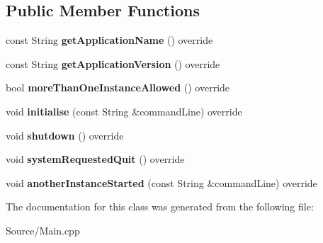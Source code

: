 \subsection*{Public Member Functions}
\begin{DoxyCompactItemize}
\item 
\mbox{\label{class_recorder_sampler_application_a9d0ae19d9c4a4fb43134094b8815d4f1}} 
const String {\bfseries get\+Application\+Name} () override
\item 
\mbox{\label{class_recorder_sampler_application_a2cd6e0223ee8ec0e1d74411450bf3827}} 
const String {\bfseries get\+Application\+Version} () override
\item 
\mbox{\label{class_recorder_sampler_application_aa94d517dcb004b58170554afcae0127b}} 
bool {\bfseries more\+Than\+One\+Instance\+Allowed} () override
\item 
\mbox{\label{class_recorder_sampler_application_aed87eb96784a870b896c392d92cbd85e}} 
void {\bfseries initialise} (const String \&command\+Line) override
\item 
\mbox{\label{class_recorder_sampler_application_abda56b993d8a5001ad58c0a68bd33646}} 
void {\bfseries shutdown} () override
\item 
\mbox{\label{class_recorder_sampler_application_a616e76d22f5aa2df5e57e520b737c97c}} 
void {\bfseries system\+Requested\+Quit} () override
\item 
\mbox{\label{class_recorder_sampler_application_a479f26a7ee1aca39c1149bee71f3d005}} 
void {\bfseries another\+Instance\+Started} (const String \&command\+Line) override
\end{DoxyCompactItemize}


The documentation for this class was generated from the following file\+:\begin{DoxyCompactItemize}
\item 
Source/Main.\+cpp\end{DoxyCompactItemize}
